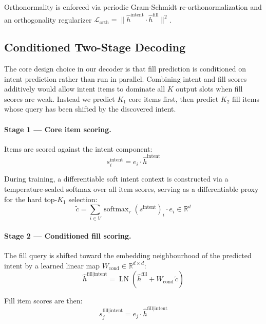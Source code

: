\documentclass[conference]{IEEEtran}
\begin{document}
Orthonormality is enforced via periodic Gram-Schmidt
re-orthonormalization and an orthogonality regularizer
$\mathcal{L}_{\text{orth}} = \|\hat{h}^{\text{intent}} \cdot
\hat{h}^{\text{fill}}\|^2$.

\subsection{Conditioned Two-Stage Decoding}
\label{subsec:decode}

The core design choice in our decoder is that fill prediction is
conditioned on intent prediction rather than run in parallel. Combining
intent and fill scores additively would allow intent items to dominate
all $K$ output slots when fill scores are weak. Instead we predict
$K_1$ core items first, then predict $K_2$ fill items whose query has
been shifted by the discovered intent.

\paragraph{Stage 1 --- Core item scoring.}
Items are scored against the intent component:
\begin{equation}
s_i^{\text{intent}} = e_i \cdot \hat{h}^{\text{intent}}
\end{equation}

During training, a differentiable soft intent context is constructed
via a temperature-scaled softmax over all item scores, serving as a
differentiable proxy for the hard top-$K_1$ selection:
\begin{equation}
\tilde{c} = \sum_{i \in V} \operatorname{softmax}_\tau(s^{\text{intent}})_i \cdot e_i \in \mathbb{R}^d
\end{equation}

\paragraph{Stage 2 --- Conditioned fill scoring.}
The fill query is shifted toward the embedding neighbourhood of the
predicted intent by a learned linear map $W_{\text{cond}} \in \mathbb{R}^{d \times d}$:
\begin{equation}
\hat{h}^{\text{fill} \mid \text{intent}} = \operatorname{LN}\!\left(\hat{h}^{\text{fill}} + W_{\text{cond}}\, \tilde{c}\right)
\end{equation}

Fill item scores are then:
\begin{equation}
s_j^{\text{fill}\mid\text{intent}} = e_j \cdot \hat{h}^{\text{fill}\mid\text{intent}}
\end{equation}
\end{document}
